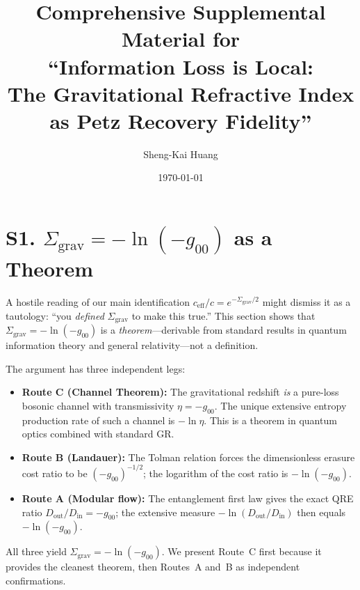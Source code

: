 \documentclass[aps,prd,preprint,superscriptaddress,longbibliography]{revtex4-2}
\newcommand{\ceff}{c_{\mathrm{eff}}}
\newcommand{\Sgrav}{\Sigma_{\mathrm{grav}}}
\begin{document}
\title{Comprehensive Supplemental Material for\\
``Information Loss is Local:\\
The Gravitational Refractive Index as Petz Recovery Fidelity''}

\author{Sheng-Kai Huang}

\date{\today}

\maketitle

\tableofcontents

\section{S1. \texorpdfstring{$\Sgrav = -\ln(-g_{00})$}{Sigma\_grav = -ln(-g00)} as a Theorem}
\label{sec:three_routes}

A hostile reading of our main identification
$\ceff/c = e^{-\Sgrav/2}$ might dismiss it as a tautology:
``you \emph{defined} $\Sgrav$ to make this true.''
This section shows that $\Sgrav = -\ln(-g_{00})$ is a
\emph{theorem}---derivable from standard results in quantum information
theory and general relativity---not a definition.

The argument has three independent legs:
\begin{itemize}
\item \textbf{Route C (Channel Theorem):} The gravitational redshift
  \emph{is} a pure-loss bosonic channel with transmissivity
  $\eta = -g_{00}$.  The unique extensive entropy production rate
  of such a channel is $-\ln\eta$.
  This is a theorem in quantum optics combined with standard GR.
\item \textbf{Route B (Landauer):} The Tolman relation forces
  the dimensionless erasure cost ratio to be $(-g_{00})^{-1/2}$;
  the logarithm of the cost ratio is $-\ln(-g_{00})$.
\item \textbf{Route A (Modular flow):} The entanglement first law
  gives the exact QRE ratio $D_{\mathrm{out}}/D_{\mathrm{in}}
  = -g_{00}$; the extensive measure $-\ln(D_{\mathrm{out}}/D_{\mathrm{in}})$
  then equals $-\ln(-g_{00})$.
\end{itemize}
All three yield $\Sgrav = -\ln(-g_{00})$.  We present Route~C first
because it provides the cleanest theorem, then Routes~A and~B as
independent confirmations.
\end{document}
